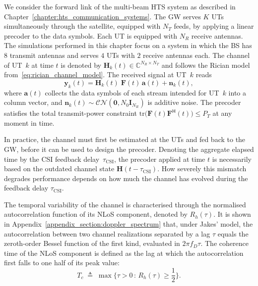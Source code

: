 We consider the forward link of the multi-beam \ac{HTS} system as described in Chapter~\ref{chapter:hts_communication_systems}. 
The \ac{GW} serves $K$ \acp{UT} simultaneously through the satellite, equipped with $N_T$ feeds, by applying a linear precoder to the data symbols.
Each \ac{UT} is equipped with $N_R$ receive antennas.
The simulations performed in this chapter focus on a system in which the \ac{BS} has $8$ transmit antennas and serves $4$ \acp{UT} with $2$ receive antennas each.
The channel of \ac{UT}~$k$ at time $t$ is denoted by $\mathbf{H}_k(t) \in \mathbb{C}^{N_R \times N_T}$ and follows the Rician model from~\eqref{eq:rician_channel_model}.
The received signal at \ac{UT}~$k$ reads
\begin{equation}
\label{eq:outdated_csi_received_signal}
    \mathbf{y}_k(t) = \mathbf{H}_k(t)\;\mathbf{F}(t)\,\mathbf{a}(t) + \mathbf{n}_k(t),
\end{equation}
where $\mathbf{a}(t)$ collects the data symbols of each stream intended for \ac{UT}~$k$ into a column vector, and $\mathbf{n}_k(t) \sim \mathcal{CN}(\mathbf{0}, N_0 \mathbf{I}_{N_R})$ is additive noise.
The precoder satisfies the total transmit-power constraint $\mathrm{tr}\big(\mathbf{F}(t)\mathbf{F}^{\mathsf{H}}(t)\big) \leq P_T$ at any moment in time.

In practice, the channel must first be estimated at the \acp{UT} and fed back to the \ac{GW}, before it can be used to design the precoder.
Denoting the aggregate elapsed time by the \ac{CSI} feedback delay~$\tau_{\mathrm{CSI}}$, the precoder applied at time $t$ is necessarily based on the outdated channel state $\mathbf{H}(t - \tau_{\mathrm{CSI}})$.
How severely this mismatch degrades performance depends on how much the channel has evolved during the feedback delay $\tau_{\mathrm{CSI}}$.

The temporal variability of the channel is characterised through the normalised autocorrelation function of its \ac{NLoS} component, denoted by $R_h(\tau)$.
It is shown in Appendix~\ref{appendix_section:doppler_spectrum} that, under Jakes' model, the autocorrelation between two channel realizations separated by a lag $\tau$ equals the zeroth-order Bessel function of the first kind, evaluated in $2\pi f_D \tau$.
The coherence time of the \ac{NLoS} component is defined as the lag at which the autocorrelation first falls to one half of its peak value:
\begin{equation}
\label{eq:coherence_time_def}
    T_c \;\triangleq\; \max\{\tau > 0 \,:\, R_h(\tau) \geq \frac{1}{2}\}.
\end{equation}


